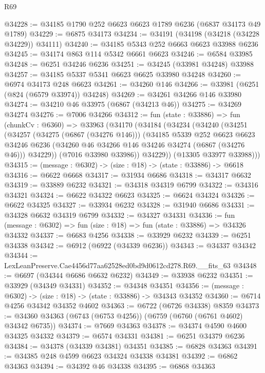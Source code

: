 \begin{lexlean}{R69}
\begin{coremodule}
{@34228 := @34185 @1790 @252 @6623 @6623 @1789 @6236 (@6837 @34173 @49 @1789)
@34229 := @6875 @34173
@34234 := @34191 (@34198 (@34218 (@34228 @34229)) @34111)
@34240 := @34185 @5343 @252 @6663 @6623 @33988 @6236
@34245 := @34174 @863 @114 @5342 @6661 @6623
@34246 := @6584 @33985
@34248 := @6251 @34246 @6236
@34251 := @34245 (@33981 @34248) @33988
@34257 := @34185 @5337 @5341 @6623 @6625 @33980 @34248
@34260 := @6974 @34173 @248 @6623
@34261 := @34260 @146
@34266 := @33981 (@6251 (@824 (@6579 @33974)) @34248)
@34269 := @34261 @34266 @146 @33980
@34274 := @34210 @46 @33975 (@6867 (@34213 @46))
@34275 := @34269 @34274
@34276 := @7006 @34266
@34312 := fun (state : @33886) =>
  fun (chunkCv : @6360) =>
  @33963
    (@34170
      (@34184
        (@34234
          (@34240
            (@34251
              (@34257
                (@34275 (@6867 (@34276 @146)))
                (@34185
                  @5339
                  @252
                  @6623
                  @6623
                  @34246
                  @6236
                  (@34260 @46 @34266 @146 @34246 @34274 (@6867 (@34276 @46)))
                  @34229))
              (@7016 @33980 @33986))
            @34229))
        (@13305 @33977 @33988)))
@34315 := (message : @6302) -> (size : @18) -> (state : @33886) -> @6618
@34316 := @6622 @6668
@34317 := @31934 @6686
@34318 := @34317 @6632
@34319 := @33889 @6232
@34321 := @34318 @34319 @6799
@34322 := @34316 @34321
@34324 := @6622 @34322 @6623
@34325 := @6624 @34324
@34326 := @6622 @34325
@34327 := @33934 @6232
@34328 := @31940 @6686
@34331 := @34328 @6632 @34319 @6799
@34332 := @34327 @34331
@34336 := fun (message : @6302) => fun (size : @18) => fun (state : @33886) => @34326 @34332
@34337 := @6683 @4256
@34338 := @33929 @6232
@34339 := @6251 @34338
@34342 := @6912 (@6922 (@34339 @6236))
@34343 := @34337 @34342
@34344 := LexLeanPreserve.Cae4456d77aa62528ed0bd9d0612cd278.R69.__fits_63
@34348 := @6697 (@34344 @6686 @6632 @6232)
@34349 := @33938 @6232
@34351 := @33929 (@34349 @34331)
@34352 := @34348 @34351
@34356 := (message : @6302) -> (size : @18) -> (state : @33886) -> @34343 @34352
@34360 := @6714 @4256 @34342 @34352 @4602
@34363 := @6722 (@6726 @34338) @8359
@34373 := @34360 @34363 (@6743 (@6753 @4256)) (@6759 (@6760 (@6761 @4602) @34342 @6735))
@34374 := @7669 @34363
@34378 := @34374 @4590 @4600 @34325 @34332
@34379 := @6574 @34331
@34381 := @6251 @34379 @6236
@34384 := @34378 (@34339 @34381) @34351
@34385 := @6828 @34363
@34391 := @34385 @248 @4599 @6623 @34324 @34338 @34381
@34392 := @6862 @34363
@34394 := @34392 @46 @34338
@34395 := @6868 @34363
}
\end{coremodule}
\end{lexlean}
